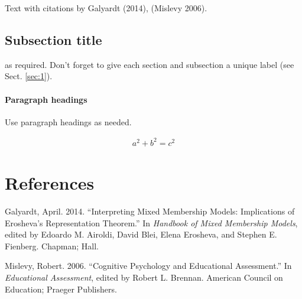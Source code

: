 \documentclass[smallextended]{svjour3}       %
\begin{document}
Text with citations by Galyardt (2014), (Mislevy 2006).

\subsection{Subsection title}\label{sec:2}

as required. Don't forget to give each section and subsection a unique
label (see Sect. \ref{sec:1}).

\paragraph{Paragraph headings}\label{paragraph-headings}

Use paragraph headings as needed.

\begin{align}
a^2+b^2=c^2
\end{align}

\section*{References}\label{references}

\hypertarget{refs}{}
\hypertarget{ref-Galyardt14mmm}{}
Galyardt, April. 2014. ``Interpreting Mixed Membership Models:
Implications of Erosheva's Representation Theorem.'' In \emph{Handbook
of Mixed Membership Models}, edited by Edoardo M. Airoldi, David Blei,
Elena Erosheva, and Stephen E. Fienberg. Chapman; Hall.

\hypertarget{ref-Mislevy06Cog}{}
Mislevy, Robert. 2006. ``Cognitive Psychology and Educational
Assessment.'' In \emph{Educational Assessment}, edited by Robert L.
Brennan. American Council on Education; Praeger Publishers.



\end{document}
